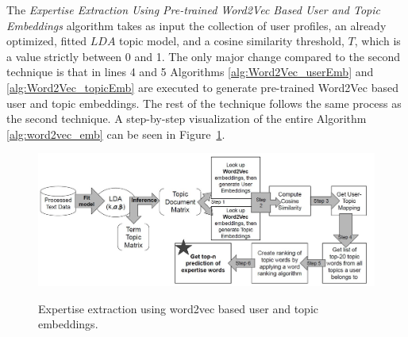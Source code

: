             The \emph{Expertise Extraction Using Pre-trained Word2Vec Based User and Topic Embeddings} algorithm takes as input the collection of user profiles, an already optimized, fitted $LDA$ topic model, and a cosine similarity threshold, $T$, which is a value strictly between 0 and 1. The only major change compared to the second technique is that in lines 4 and 5 Algorithms \ref{alg:Word2Vec_userEmb} and \ref{alg:Word2Vec_topicEmb} are executed to generate pre-trained Word2Vec based user and topic embeddings. The rest of the technique follows the same process as the second technique. A step-by-step visualization of the entire Algorithm \ref{alg:word2vec_emb} can be seen in Figure~\ref{fig:technique3}.
            
            \begin{figure}[!ht]
              \centering
              \includegraphics[width=\textwidth]{figures/technique3.JPG}\\
              \caption{Expertise extraction using word2vec based user and topic embeddings.}
              \label{fig:technique3}
            \end{figure}
        
